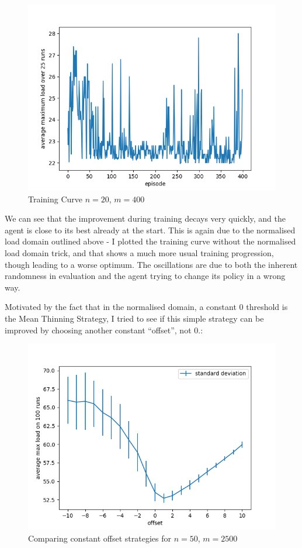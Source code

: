 \begin{figure}[hbt!] \label{two-thinning-training-curve}
    \centering
    \includegraphics[scale=1.0]{Chapter4/Figs/training_progression_20_400.png}
    \caption{\TwoThinning Training Curve $n=20$, $m=400$}
\end{figure}


We can see that the improvement during training decays very quickly, and the agent is close to its best already at the start. This is again due to the normalised load domain outlined above - I plotted the training curve without the normalised load domain trick, and that shows a much more usual training progression, though leading to a worse optimum. The oscillations are due to both the inherent randomness in evaluation and the agent trying to change its policy in a wrong way.


Motivated by the fact that in the normalised domain, a constant $0$ threshold is the Mean Thinning Strategy, I tried to see if this simple strategy can be improved by choosing another constant ``offset'', not $0$.:

\begin{figure}[hbt!] \label{two-thinning-constant-offset}
    \centering
    \includegraphics[scale=1.0]{Chapter4/Figs/offset_analysis_50_2500.png}
    \caption{Comparing constant offset strategies for $n=50$, $m=2500$}
\end{figure}


